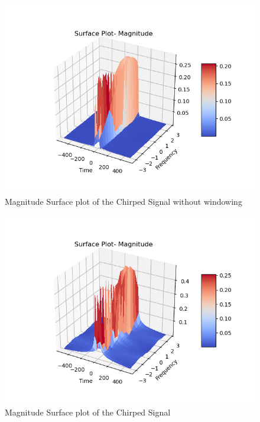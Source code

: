 \documentclass[12pt, a4paper]{report}
\begin{document}
    \begin{figure}[!tbh]
   	\centering
   	\includegraphics[scale=0.7]{Q6c.png}
	\caption{Magnitude Surface plot of the Chirped Signal without windowing}
 \end{figure} 

   \begin{figure}[!tbh]
   	\centering
   	\includegraphics[scale=0.7]{Q6a.png}
	\caption{Magnitude Surface plot of the Chirped Signal}
 \end{figure} 
\end{document}
